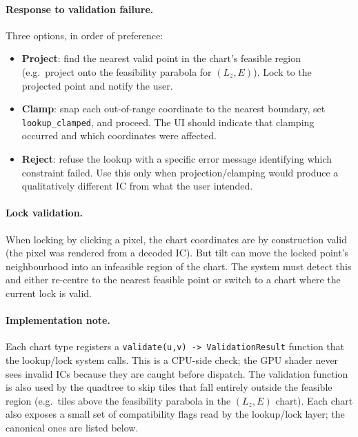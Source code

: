 \documentclass[11pt]{report}
\begin{document}
\paragraph{Response to validation failure.} Three options, in order of preference:
\begin{itemize}[nosep]
\item \textbf{Project}: find the nearest valid point in the chart's feasible region (e.g.\ project onto the feasibility parabola for $(L_z,E)$). Lock to the projected point and notify the user.
\item \textbf{Clamp}: snap each out-of-range coordinate to the nearest boundary, set \texttt{lookup\_clamped}, and proceed. The UI should indicate that clamping occurred and which coordinates were affected.
\item \textbf{Reject}: refuse the lookup with a specific error message identifying which constraint failed. Use this only when projection/clamping would produce a qualitatively different IC from what the user intended.
\end{itemize}

\paragraph{Lock validation.} When locking by clicking a pixel, the chart coordinates are by construction valid (the pixel was rendered from a decoded IC). But tilt can move the locked point's neighbourhood into an infeasible region of the chart. The system must detect this and either re-centre to the nearest feasible point or switch to a chart where the current lock is valid.

\paragraph{Implementation note.} Each chart type registers a \texttt{validate(u,v) -> ValidationResult} function that the lookup/lock system calls. This is a CPU-side check; the GPU shader never sees invalid ICs because they are caught before dispatch. The validation function is also used by the quadtree to skip tiles that fall entirely outside the feasible region (e.g.\ tiles above the feasibility parabola in the $(L_z,E)$ chart). Each chart also exposes a small set of compatibility flags read by the lookup/lock layer; the canonical ones are listed below.
\end{document}
